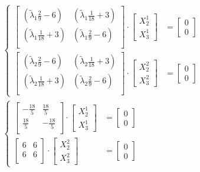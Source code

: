 \begin{align*}
  \begin{cases}
  \begin{bmatrix}
    \left( \widetilde{\lambda}_1 \frac{2}{9} - 6 \right) & \left( \widetilde{\lambda}_1 \frac{1}{18} + 3 \right) \\
    \left( \widetilde{\lambda}_1 \frac{1}{18} + 3 \right) & \left( \widetilde{\lambda}_1 \frac{2}{9} - 6 \right) \\
  \end{bmatrix} \cdot
  \begin{bmatrix}
    X_2^1 \\
    X_3^1 
  \end{bmatrix} &=
  \begin{bmatrix}
    0 \\
    0
  \end{bmatrix} \\
  \begin{bmatrix}
    \left( \widetilde{\lambda}_2 \frac{2}{9} - 6 \right) & \left( \widetilde{\lambda}_2 \frac{1}{18} + 3 \right) \\
    \left( \widetilde{\lambda}_2 \frac{1}{18} + 3 \right) & \left( \widetilde{\lambda}_2 \frac{2}{9} - 6 \right) \\
  \end{bmatrix} \cdot
  \begin{bmatrix}
    X_2^2 \\
    X_3^2 
  \end{bmatrix} &=
  \begin{bmatrix}
    0 \\
    0
  \end{bmatrix}
  \end{cases}&\\
  \begin{cases}
  \begin{bmatrix}
    -\frac{18}{5} &  \frac{18}{5} \\
     \frac{18}{5} & -\frac{18}{5} \\
  \end{bmatrix} \cdot
  \begin{bmatrix}
    X_2^1 \\
    X_3^1 
  \end{bmatrix} &=
  \begin{bmatrix}
    0 \\
    0
  \end{bmatrix} \\
  \begin{bmatrix}
    6 & 6 \\
    6 & 6 \\
  \end{bmatrix} \cdot
  \begin{bmatrix}
    X_2^2 \\
    X_3^2 
  \end{bmatrix} &=
  \begin{bmatrix}
    0 \\
    0
  \end{bmatrix}
  \end{cases}&
\end{align*}
